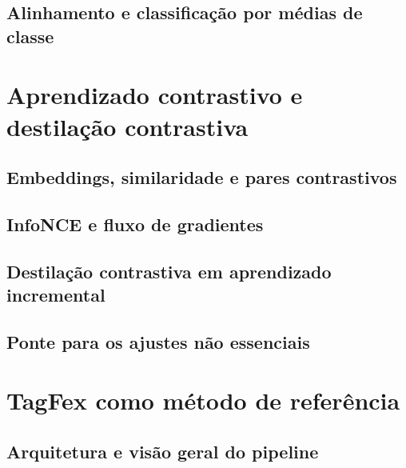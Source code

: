 \subsection{Alinhamento e classificação por médias de classe}

\section{Aprendizado contrastivo e destilação contrastiva}

\subsection{Embeddings, similaridade e pares contrastivos}

\subsection{InfoNCE e fluxo de gradientes}

\subsection{Destilação contrastiva em aprendizado incremental}

\subsection{Ponte para os ajustes não essenciais}

\section{TagFex como método de referência}

\subsection{Arquitetura e visão geral do pipeline}

